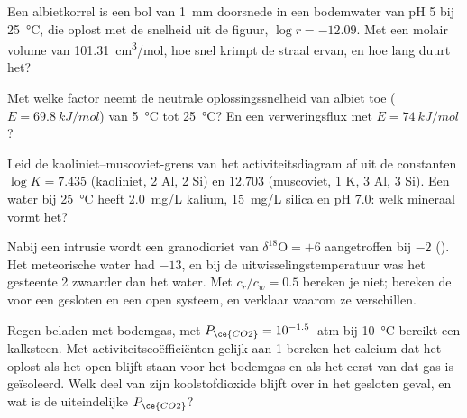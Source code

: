 \begin{exercise}[$\star\star$]\label{exo:b3:water-rock-interaction:7}
Een albietkorrel is een bol van \qty{1}{mm} doorsnede in een bodemwater van pH 5 bij
\qty{25}{\celsius}, die oplost met de snelheid uit de figuur, $\log r = -12.09$.
Met een molair volume van \qty{101.31}{cm^3/mol}, hoe snel krimpt de straal
ervan, en hoe lang duurt het?
\end{exercise}

\begin{exercise}[$\star\star$]\label{exo:b3:water-rock-interaction:8}
Met welke factor neemt de neutrale oplossingssnelheid van albiet toe ($E =
\qty{69.8}{kJ/mol}$) van \qty{5}{\celsius} tot \qty{25}{\celsius}? En
een verweringsflux met $E = \qty{74}{kJ/mol}$?
\end{exercise}

\begin{exercise}[$\star\star$]\label{exo:b3:water-rock-interaction:9}
Leid de kaoliniet--muscoviet-grens van het activiteitsdiagram af uit de
constanten $\log K = 7.435$ (kaoliniet, 2 Al, 2 Si) en $12.703$ (muscoviet, 1
K, 3 Al, 3 Si). Een water bij \qty{25}{\celsius} heeft \qty{2.0}{mg/L}
kalium, \qty{15}{mg/L} silica en pH 7.0: welk mineraal vormt het?
\end{exercise}

\begin{exercise}[$\star\star\star$]\label{exo:b3:water-rock-interaction:10}
Nabij een intrusie wordt een granodioriet van $\delta^{18}\mathrm O = +6$ aangetroffen
bij $-2$ (\unit{\permil}). Het meteorische water had $-13$, en bij de
uitwisselingstemperatuur was het gesteente \qty{2}{\permil} zwaarder dan het
water. Met $c_r/c_w = 0.5$ bereken je niet; bereken de  voor een gesloten en
een open systeem, en verklaar waarom ze verschillen.
\end{exercise}

\begin{exercise}[$\star\star\star$]\label{exo:b3:water-rock-interaction:11}
Regen beladen met bodemgas, met $P_{\ce{CO2}} = 10^{-1.5}$~atm bij
\qty{10}{\celsius} bereikt een kalksteen. Met activiteitscoëfficiënten gelijk aan 1
bereken het calcium dat het oplost als het open blijft staan voor het bodemgas en als het
eerst van dat gas is geïsoleerd. Welk deel van zijn koolstofdioxide blijft over in het
gesloten geval, en wat is de uiteindelijke $P_{\ce{CO2}}$?
\end{exercise}

